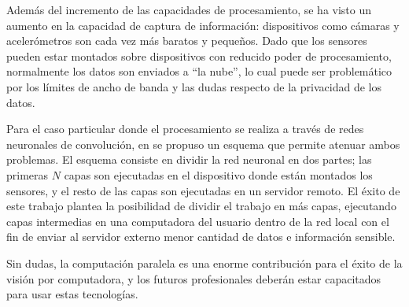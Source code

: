 Además del incremento de las capacidades de procesamiento, se ha visto un
aumento en la capacidad de captura de información: dispositivos como cámaras y
acelerómetros son cada vez más baratos y pequeños. Dado que los sensores pueden
estar montados sobre dispositivos con reducido poder de procesamiento,
normalmente los datos son enviados a ``la nube'', lo cual puede ser problemático
por los límites de ancho de banda y las dudas respecto de la privacidad de los
datos.

Para el caso particular donde el procesamiento se realiza a través de redes
neuronales de convolución, en \cite{pipelinebasedCaffe2017} se propuso un
esquema que permite atenuar ambos problemas. El esquema consiste en dividir la
red neuronal en dos partes; las primeras $N$ capas son ejecutadas en el
dispositivo donde están montados los sensores, y el resto de las capas son
ejecutadas en un servidor remoto. El éxito de este trabajo plantea la
posibilidad de dividir el trabajo en más capas, ejecutando capas intermedias en
una computadora del usuario dentro de la red local con el fin de enviar al
servidor externo menor cantidad de datos e información sensible.

Sin dudas, la computación paralela es una enorme contribución para el éxito de
la visión por computadora, y los futuros profesionales deberán estar capacitados
para usar estas tecnologías.
